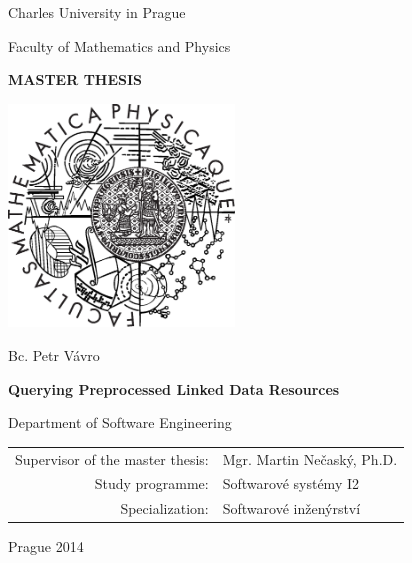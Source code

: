 \documentclass[12pt,a4paper,draft]{report}
\begin{document}


\pagestyle{empty}
\setcounter{page}{-10} %

\ifdraft{\listoftodos}
\ifdraft{\newpage}

\begin{center}

\large

Charles University in Prague

\medskip

Faculty of Mathematics and Physics

\vfill

{\bf\Large MASTER THESIS}

\vfill

\centerline{\mbox{\includegraphics[width=60mm]{../img/logo.eps}}}

\vfill
\vspace{5mm}

{\LARGE Bc. Petr Vávro}

\vspace{15mm}

{\LARGE\bfseries Querying Preprocessed Linked Data Resources}

\vfill

Department of Software Engineering

\vfill

\begin{tabular}{rl}

Supervisor of the master thesis: & Mgr. Martin Nečaský, Ph.D. \\
\noalign{\vspace{2mm}}
Study programme: & Softwarové systémy I2 \\
\noalign{\vspace{2mm}}
Specialization: & Softwarové inženýrství \\
\end{tabular}

\vfill

Prague 2014

\end{center}
\end{document}
